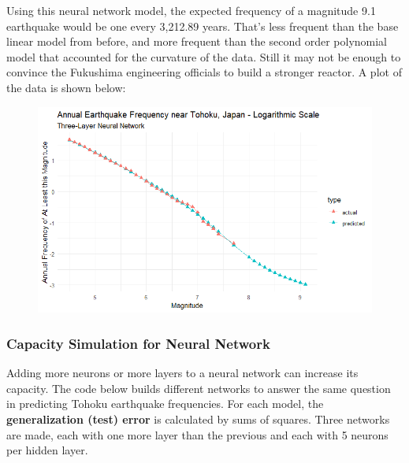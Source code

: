 Using this neural network model, the expected frequency of a magnitude
9.1 earthquake would be one every 3,212.89 years.  That's less frequent than the base linear model from before, and more frequent than the second order polynomial model that accounted for the curvature of the data.  Still it may not be enough to convince the Fukushima engineering officials to build a stronger reactor.  A plot of the data is shown below:

\begin{figure}[H]
    \center
    \includegraphics[width=0.8\linewidth]{Figures/tohoku_logscale_mlp.png}
    \label{tohoku_mlp}
\end{figure}


\subsubsection{Capacity Simulation for Neural Network}

Adding more neurons or more layers to a neural network can increase its capacity.  The code below builds different networks to answer the same question in predicting Tohoku earthquake frequencies.  For each model, the \textbf{generalization (test) error} is calculated by sums of squares.  Three networks are made, each with one more layer than the previous and each with 5 neurons per hidden layer.

